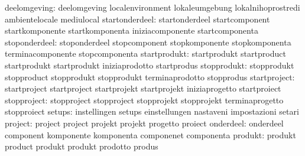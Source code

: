                     deelomgeving: deelomgeving                     localenvironment
                                  lokaleumgebung                   lokalnihoprostredi
                                  ambientelocale                   mediulocal
                  startonderdeel: startonderdeel                   startcomponent
                                  startkomponente                  startkomponenta
                                  iniziacomponente                 startcomponenta
                   stoponderdeel: stoponderdeel                    stopcomponent
                                  stopkomponente                   stopkomponenta
                                  terminacomponente                stopcomponenta
                    startprodukt: startprodukt                     startproduct
                                  startprodukt                     startprodukt
                                  iniziaprodotto                   startprodus
                     stopprodukt: stopprodukt                      stopproduct
                                  stopprodukt                      stopprodukt
                                  terminaprodotto                  stopprodus
                    startproject: startproject                     startproject
                                  startprojekt                     startprojekt
                                  iniziaprogetto                   startproiect
                     stopproject: stopproject                      stopproject
                                  stopprojekt                      stopprojekt
                                  terminaprogetto                  stopproiect
                          setups: instellingen                     setups
                                  einstellungen                    nastaveni
                                  impostazioni                     setari
                         project: project                          project
                                  projekt                          projekt
                                  progetto                         proiect
                       onderdeel: onderdeel                        component
                                  komponente                       komponenta
                                  componenet                       componenta
                         produkt: produkt                          product
                                  produkt                          produkt
                                  prodotto                         produs
